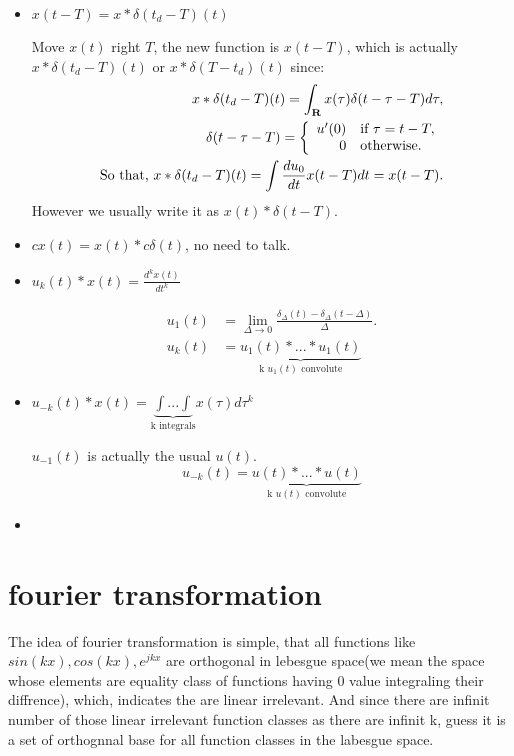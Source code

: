 \documentclass[11pt]{article}
\begin{document}
\begin{itemize}
\item \(x(t - T) = x * \delta(t_d - T)(t)\) 

Move \(x(t)\) right \(T\), the new function is \(x(t - T)\), which is actually \(x * \delta(t_d - T)(t) \text{ or } x * \delta(T - t_d)(t)\) since:
\begin{align}
  x*\delta(t_d - T)(t) = \int_{\mathbf{R}}x(\tau)\delta(t-\tau-T)d\tau, \notag \\
  \delta(t-\tau-T) = \left\{
    \begin{array}{rl}
      u'(0) & \text{if } \tau = t - T, \\
      0 & \text{otherwise}.
    \end{array}
  \right. \notag \\
  \text{So that, } x*\delta(t_d - T)(t) = \int \frac{du_0}{dt} x(t - T) dt = x(t - T). \notag
\end{align}
However we usually write it as \(x(t) * \delta(t - T)\).
\item \(cx(t) = x(t) * c\delta(t)\), no need to talk.
\item \(u_k(t)*x(t) = \frac{d^kx(t)}{dt^k}\)

\begin{align}
  u_1(t) & = \lim_{\varDelta \rightarrow 0}
           \frac{
           \delta_{\varDelta}(t) - \delta_{\varDelta}(t - \varDelta)}
           {
           \varDelta}. \\ 
  u_k(t) & = \underbrace{u_1(t) * ... * u_1(t)}_{\text{k } u_1(t) \text{ convolute}}
\end{align}
\item \(u_{-k}(t)*x(t) = \underbrace{\int ... \int}_{\text{k integrals}} x(\tau)d\tau^k\)

\(u_{-1}(t)\) is actually the usual \(u(t)\).
\begin{equation}
  u_{-k}(t) = \underbrace{u(t) * ... * u(t)}_{\text{k } u(t) \text{ convolute}}
\end{equation}
\item 
\end{itemize}
\section{fourier transformation}
\label{sec:org542d444}

The idea of fourier transformation is simple, that all functions like \(sin(kx), cos(kx), e^{jkx}\) are orthogonal in lebesgue space(we mean the space whose elements are equality class of functions having 0 value integraling their diffrence), which, indicates the are linear irrelevant. And since there are infinit number of those linear irrelevant function classes as there are infinit k, guess it is a set of orthognnal base for all function classes in the labesgue space.
\end{document}
